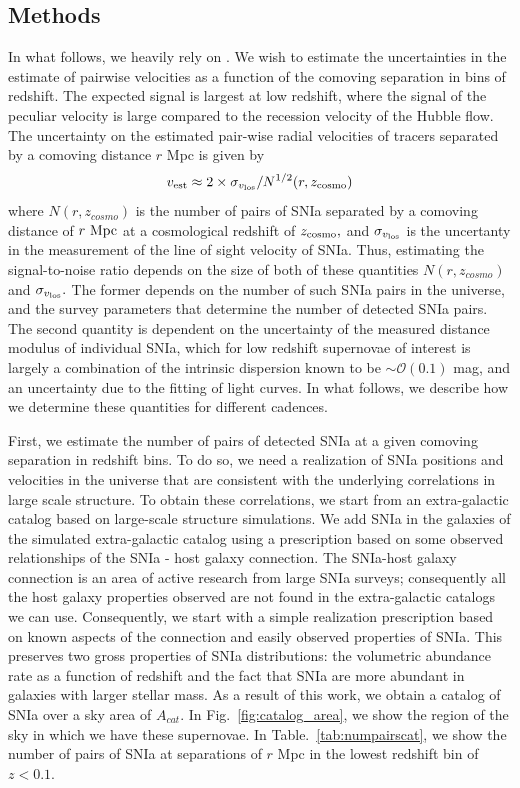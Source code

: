 \subsection{Methods}
In what follows, we heavily rely on \cite{2011PhRvD..83d3004B}. We wish to estimate the uncertainties in the estimate of pairwise velocities as a function of the comoving separation in bins of redshift. The expected signal is largest at low redshift, where the signal of the peculiar velocity is large compared to the recession velocity of the Hubble flow.  The uncertainty on the estimated pair-wise radial velocities of tracers separated by a comoving distance $r$ Mpc is given by
\begin{equation}
v_{\rm{est}} \approx 2 \times \sigma_{v_{\rm{los}}} / N^{1/2}(r, z_{\rm{cosmo}})
\end{equation}
where $N(r,z_{cosmo})$ is the number of pairs of SNIa separated by a comoving distance of $r~\rm{Mpc}$
at a cosmological redshift of $z_{\rm{cosmo}},$ and $\sigma_{v_{\rm{los}}}$ is the uncertanty in the
measurement of the line of sight velocity of SNIa. Thus, estimating the signal-to-noise ratio depends on the size of both of these quantities $N(r, z_{cosmo})$ and $\sigma_{v_{\rm{los}}}.$ The former depends on the number of such SNIa pairs in the universe, and the survey parameters that determine the number of detected SNIa pairs. The second quantity is dependent on the uncertainty of the measured distance modulus of individual SNIa, which for low redshift supernovae of interest is largely a combination of the intrinsic dispersion known to be $\sim \mathcal{O}(0.1)$ mag, and an uncertainty due to the fitting of light curves. In what follows, we describe how we determine these quantities for different cadences. 

First, we estimate the number of pairs of detected SNIa at a given comoving separation in redshift bins. To do so, we need a realization of SNIa positions and velocities in the universe that are consistent with the underlying correlations in large scale structure. To obtain these correlations, we start from an extra-galactic catalog based on large-scale structure simulations. We add SNIa in the galaxies of the simulated extra-galactic catalog using a prescription based on some observed relationships of the SNIa - host galaxy connection. The SNIa-host galaxy connection is an area of active research from large SNIa surveys; consequently all the host galaxy properties observed are not found in the extra-galactic catalogs we can use. Consequently, we start with a simple realization prescription based on known aspects of the connection and easily observed properties of SNIa. This preserves two gross properties of SNIa distributions: the volumetric abundance rate as a function of redshift and the fact that SNIa are more abundant in galaxies with larger stellar mass. As a result of this work, we obtain a catalog of SNIa over a sky area of $A_{cat}.$ In Fig.~\ref{fig:catalog_area}, we show the region of the sky in which we have these supernovae. In Table.~\ref{tab:numpairscat}, we show the number of pairs of SNIa at separations of $r$ Mpc in the lowest redshift bin of $z < 0.1.$

